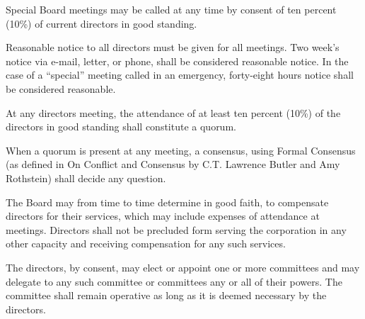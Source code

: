 \begin{art}
\begin{asec}
\end{asec}
\begin{asec}

Special Board meetings may be called at any time by consent of ten
percent (10\%) of current directors in good standing.

\end{asec}
\begin{asec}[Notice]

Reasonable notice to all directors must be given
for all meetings.  Two week's notice via e-mail, letter, or phone,
shall be considered reasonable notice.  In the case of a
``special'' meeting called in an emergency, forty-eight hours
notice shall be considered reasonable.

\end{asec}
\begin{asec}[Quorum]

At any directors meeting, the attendance of at least ten percent
(10\%) of the directors in good standing shall constitute a
quorum.

\end{asec}
\begin{asec}

When a quorum is present at any meeting, a consensus, using Formal
Consensus (as defined in On Conflict and Consensus by
C.T. Lawrence Butler and Amy Rothstein) shall decide any question.

\end{asec}
\begin{asec}[Compensation]

The Board may from time to time determine in good faith, to
compensate directors for their services, which may include
expenses of attendance at meetings.  Directors shall not be
precluded form serving the corporation in any other capacity and
receiving compensation for any such services.

\end{asec}
\begin{asec}[Committees]

The directors, by consent, may elect or appoint one or more
committees and may delegate to any such committee or committees
any or all of their powers.  The committee shall remain operative
as long as it is deemed necessary by the directors.

\end{asec}
\end{art}
\clearpage

